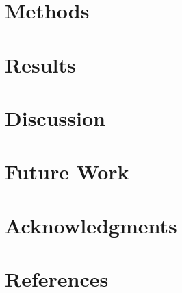 \documentclass{acm_proc_article-sp}
\begin{document}
\section{Methods}


\section{Results}


\section{Discussion}


\section{Future Work}


\section{Acknowledgments}


\section{References}
\end{document}
